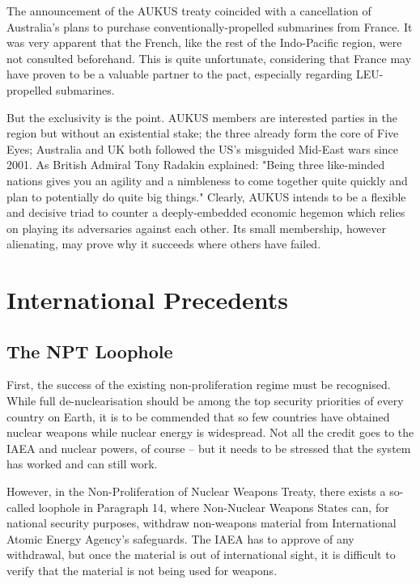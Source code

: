 \documentclass[letterpaper,12pt,twoside]{article} %
\begin{document}
\begin{multicols}{2}
The announcement of the AUKUS treaty coincided with a cancellation of Australia's plans to purchase conventionally-propelled submarines from France. It was very apparent that the French, like the rest of the Indo-Pacific region, were not consulted beforehand. This is quite unfortunate, considering that France may have proven to be a valuable partner to the pact, especially regarding LEU-propelled submarines.


But the exclusivity is the point. AUKUS members are interested parties in the region but without an existential stake; the three already form the core of Five Eyes; Australia and UK both followed the US's misguided Mid-East wars since 2001. As British Admiral Tony Radakin explained: "Being three like-minded nations gives you an agility and a nimbleness to come together quite quickly and plan to potentially do quite big things."\autocite[4]{tsuruoka2021aukus} Clearly, AUKUS intends to be a flexible and decisive triad to counter a deeply-embedded economic hegemon which relies on playing its adversaries against each other. Its small membership, however alienating, may prove why it succeeds where others have failed.

\vfill
\pagebreak
\section{International Precedents}

\subsection{The NPT Loophole}
First, the success of the existing non-proliferation regime must be recognised. While full de-nuclearisation should be among the top security priorities of every country on Earth, it is to be commended that so few countries have obtained nuclear weapons while nuclear energy is widespread. Not all the credit goes to the IAEA and nuclear powers, of course -- but it needs to be stressed that the system has worked and can still work.

However, in the Non-Proliferation of Nuclear Weapons Treaty, there exists a so-called loophole in Paragraph 14, where Non-Nuclear Weapons States can, for national security purposes, withdraw non-weapons material from International Atomic Energy Agency's safeguards. The IAEA has to approve of any withdrawal, but once the material is out of international sight, it is difficult to verify that the material is not being used for weapons.


\end{multicols}
\end{document}
